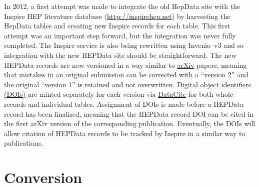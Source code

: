 \documentclass[a4paper]{jpconf}
\begin{document}
In 2012, a first attempt was made to integrate the old HepData site with the Inspire HEP literature database (\url{http://inspirehep.net}) by harvesting the HepData tables and creating new Inspire records for each table.  This first attempt was an important step forward, but the integration was never fully completed.  The Inspire service is also being rewritten using Invenio~v3 and so integration with the new HEPData site should be straightforward.  The new HEPData records are now versioned in a way similar to \href{https://arxiv.org/}{arXiv} papers, meaning that mistakes in an original submission can be corrected with a ``version 2'' and the original ``version 1'' is retained and not overwritten.  \href{https://www.doi.org}{Digital object identifiers (DOIs)} are minted separately for each version via \href{https://www.datacite.org}{DataCite} for both whole records and individual tables.  Assignment of DOIs is made before a HEPData record has been finalised, meaning that the HEPData record DOI can be cited in the first arXiv version of the corresponding publication.  Eventually, the DOIs will allow citation of HEPData records to be tracked by Inspire in a similar way to publications.

\section{Conversion} \label{sec:conversion}
\end{document}
